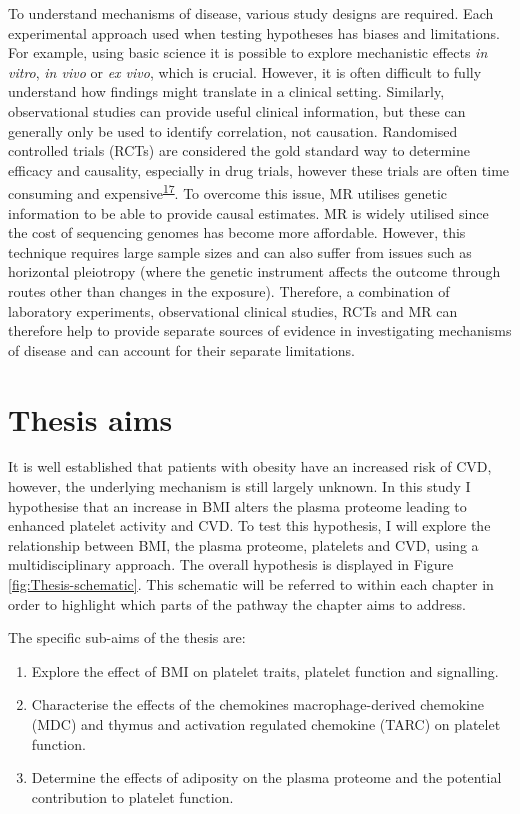 \documentclass[11pt,twoside]{bristolthesis}
\providecommand{\tightlist}{%
  \setlength{\itemsep}{0pt}\setlength{\parskip}{0pt}}
\begin{document}
To understand mechanisms of disease, various study designs are required. Each experimental approach used when testing hypotheses has biases and limitations. For example, using basic science it is possible to explore mechanistic effects \emph{in vitro}, \emph{in vivo} or \emph{ex vivo}, which is crucial. However, it is often difficult to fully understand how findings might translate in a clinical setting. Similarly, observational studies can provide useful clinical information, but these can generally only be used to identify correlation, not causation. Randomised controlled trials (RCTs) are considered the gold standard way to determine efficacy and causality, especially in drug trials, however these trials are often time consuming and expensive\textsuperscript{\protect\hyperlink{ref-Bennett2017}{17}}. To overcome this issue, MR utilises genetic information to be able to provide causal estimates. MR is widely utilised since the cost of sequencing genomes has become more affordable. However, this technique requires large sample sizes and can also suffer from issues such as horizontal pleiotropy (where the genetic instrument affects the outcome through routes other than changes in the exposure). Therefore, a combination of laboratory experiments, observational clinical studies, RCTs and MR can therefore help to provide separate sources of evidence in investigating mechanisms of disease and can account for their separate limitations.

\hypertarget{thesis-aims}{%
\section{Thesis aims}\label{thesis-aims}}

It is well established that patients with obesity have an increased risk of CVD, however, the underlying mechanism is still largely unknown. In this study I hypothesise that an increase in BMI alters the plasma proteome leading to enhanced platelet activity and CVD. To test this hypothesis, I will explore the relationship between BMI, the plasma proteome, platelets and CVD, using a multidisciplinary approach. The overall hypothesis is displayed in Figure \ref{fig:Thesis-schematic}. This schematic will be referred to within each chapter in order to highlight which parts of the pathway the chapter aims to address.

The specific sub-aims of the thesis are:
\begin{enumerate}
\def\labelenumi{\arabic{enumi})}
\tightlist
\item
  Explore the effect of BMI on platelet traits, platelet function and signalling.
\item
  Characterise the effects of the chemokines macrophage-derived chemokine (MDC) and thymus and activation regulated chemokine (TARC) on platelet function.
\item
  Determine the effects of adiposity on the plasma proteome and the potential contribution to platelet function.
\end{enumerate}
\end{document}

